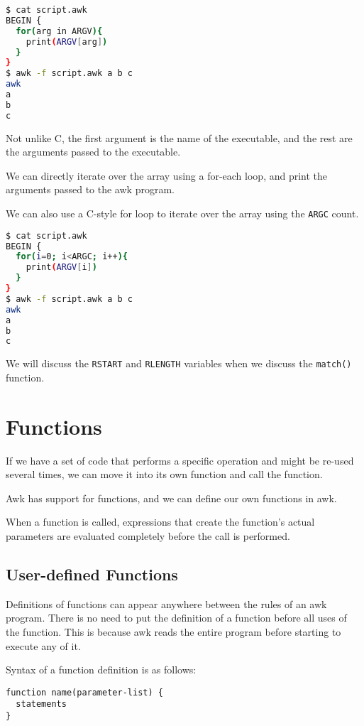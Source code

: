 \begin{lstlisting}[language=bash]
$ cat script.awk
BEGIN {
  for(arg in ARGV){
    print(ARGV[arg])
  }
}
$ awk -f script.awk a b c
awk
a
b
c
\end{lstlisting}

Not unlike C, the first argument is the name of the executable, and the rest are the arguments passed to the executable.

We can directly iterate over the array using a for-each loop, and print the arguments passed to the awk program.

We can also use a C-style for loop to iterate over the array using the \lstinline|ARGC| count.

\begin{lstlisting}[language=bash]
$ cat script.awk
BEGIN {
  for(i=0; i<ARGC; i++){
    print(ARGV[i])
  }
}
$ awk -f script.awk a b c
awk
a
b
c
\end{lstlisting}

We will discuss the \lstinline|RSTART| and \lstinline|RLENGTH| variables when we discuss the \lstinline|match()| function.

\section{Functions}

If we have a set of code that performs a specific operation and might be re-used several times, we can move it into its own function and call the function.

Awk has support for functions, and we can define our own functions in awk.

When a function is called, expressions that create the function’s actual parameters are evaluated completely before the call is performed.

\subsection{User-defined Functions}

Definitions of functions can appear anywhere between the rules of an awk program. There is no need to put the definition of a function before all uses of the function. This is because awk reads the entire program before starting to execute any of it.

Syntax of a function definition is as follows:

\begin{lstlisting}
function name(parameter-list) {
  statements
}
\end{lstlisting}

